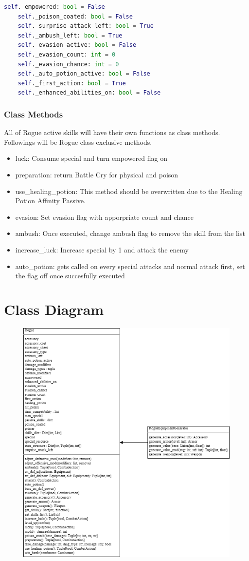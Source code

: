 \documentclass[12pt]{article} %
\begin{document}
\begin{lstlisting}[language=Python]
    self._empowered: bool = False
    self._poison_coated: bool = False
    self._surprise_attack_left: bool = True
    self._ambush_left: bool = True
    self._evasion_active: bool = False
    self._evasion_count: int = 0
    self._evasion_chance: int = 0
    self._auto_potion_active: bool = False
    self._first_action: bool = True
    self._enhanced_abilities_on: bool = False
\end{lstlisting}

\subsubsection{Class Methods}
All of Rogue active skills will have their own functions as class methods. Followings will be Rogue class exclusive methods. 
\begin{itemize}
        \item luck: Consume special and turn empowered flag on
        \item preparation: return Battle Cry for physical and poison
        \item use\_healing\_potion: This method should be overwritten due to the Healing Potion Affinity Passive. 
        \item evasion: Set evasion flag with apporpriate count and chance
        \item ambush: Once executed, change ambush flag to remove the skill from the list
        \item increase\_luck: Increase special by 1 and attack the enemy
        \item auto\_potion: gets called on every special attacks and normal attack first, set the flag off once succesfully executed
\end{itemize}

\newpage

\section{Class Diagram}
\begin{figure}[htp]
    \centering
    \includegraphics[width=0.9\linewidth]{images/rogue_diagram.png}
\end{figure}
\end{document}
